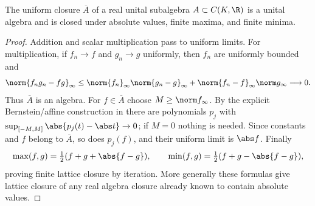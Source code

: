 \begin{theorem}
The uniform closure $\overline A$ of a real unital subalgebra $A\subset C(K,\R)$ is a unital algebra and is closed under absolute values, finite maxima, and finite minima.
\end{theorem}
\begin{proof}
Addition and scalar multiplication pass to uniform limits. For multiplication, if $f_n\to f$ and $g_n\to g$ uniformly, then $f_n$ are uniformly bounded and
\[\norm{f_ng_n-fg}_\infty\leq\norm{f_n}_\infty\norm{g_n-g}_\infty+\norm{f_n-f}_\infty\norm g_\infty\longrightarrow0.\]
Thus $\overline A$ is an algebra. For $f\in\overline A$ choose $M\geq\norm f_\infty$. By the explicit Bernstein/affine construction in  there are polynomials $p_j$ with $\sup_{[-M,M]}\abs{p_j(t)-\abs t}\to0$; if $M=0$ nothing is needed. Since constants and $f$ belong to $\overline A$, so does $p_j(f)$, and their uniform limit is $\abs f$. Finally
\[\max(f,g)=\tfrac12(f+g+\abs{f-g}),\qquad\min(f,g)=\tfrac12(f+g-\abs{f-g}),\]
proving finite lattice closure by iteration. More generally these formulas give lattice closure of any real algebra closure already known to contain absolute values.
\end{proof}

